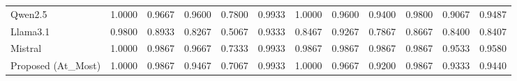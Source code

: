 \begin{table}
{\begin{tabular}{lcccccccccc||c}
            Qwen2.5                            & 1.0000                                                  & 0.9667                                                  & 0.9600                                                  & 0.7800                                                            & 0.9933                                                  & 1.0000                                                    & 0.9600                                                            & 0.9400                                                  & 0.9800                                 & 0.9067                                   & 0.9487 \\
            Llama3.1                           & 0.9800                                                  & 0.8933                                                  & 0.8267                                                  & 0.5067                                                            & 0.9333                                                  & 0.8467                                                    & 0.9267                                                            & 0.7867                                                  & 0.8667                                 & 0.8400                                   & 0.8407 \\
            Mistral                            & 1.0000                                                  & 0.9867                                                  & 0.9667                                                  & 0.7333                                                            & 0.9933                                                  & 0.9867                                                    & 0.9867                                                            & 0.9867                                                  & 0.9867                                 & 0.9533                                   & 0.9580 \\
            Proposed (At\_Most)                & 1.0000                                                  & 0.9867                                                  & 0.9467                                                  & 0.7067                                                            & 0.9933                                                  & 1.0000                                                    & 0.9667                                                            & 0.9200                                                  & 0.9867                                 & 0.9333                                   & 0.9440 \\

\end{tabular}}
\end{table}
